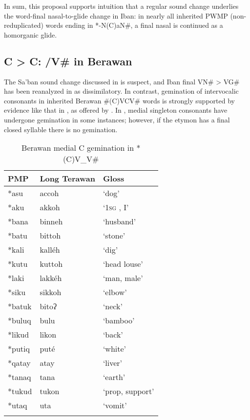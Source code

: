 \documentclass[output=paper]{langscibook}
\begin{document}
In sum, this proposal supports  intuition that a regular sound change underlies the word-final nasal-to-glide change in Iban: in nearly all inherited PWMP (non-reduplicated) words ending in *-N(C)aN\#, a final nasal is continued as a homorganic glide.

\subsection{\label{sec:blevins:3.3}C  > C: /{\longrule}V\# in Berawan}



The Sa’ban sound change discussed in  is suspect, and Iban final VN\# > VG\# has been reanalyzed in  as dissimilatory. In contrast, gemination of intervocalic consonants in inherited Berawan \#(C)VCV\# words is strongly supported by evidence like that in , as offered by \citet{Blust2005,Blust2016,Blust2018}. In , medial singleton consonants have undergone gemination in some instances; however, if the etymon has a final closed syllable there is no gemination.

\begin{table}[t]
\begin{tabularx}{.8\textwidth}{XXl}
\lsptoprule
{PMP} & {Long} {Terawan} & {Gloss}\\
\midrule
*asu & accoh   & `dog'\\
*aku & akkoh   & `1\textsc{sg} , I'\\
*bana & binneh & `husband'\\
*batu & bittoh & `stone'\\
*kali & kalléh & `dig'\\
*kutu & kuttoh & `head louse'\\
*laki & lakkéh & `man, male'\\
*siku & sikkoh & `elbow'\\
*batuk & bitoʔ & `neck'\\
*buluq & bulu  & `bamboo'\\
*likud & likon & `back'\\
*putiq & puté  & `white'\\
*qatay & atay  & `liver'\\
*tanaq & tana  & `earth'\\
*tukud & tukon & `prop, support'\\
*utaq & uta    & `vomit'\\
\lspbottomrule
\end{tabularx}
\caption{\label{tab:blevins:11}Berawan medial C gemination in *(C)V\_V\# \parencites[252]{Blust2005}[29--30]{Blust2018}}
\end{table}
\end{document}
